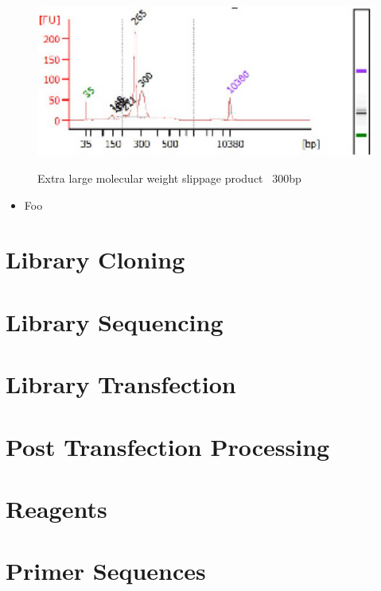 \documentclass[a4paper]{article}
\begin{document}
        	\begin{figure}[H]
				\centering
				\includegraphics[width=1.0\textwidth]{EmulsionPCRIssue.jpg}
				\label{fig:Bioanalyzer trace}
				\caption{Extra large molecular weight slippage product ~300bp}
        	\end{figure}
        \begin{itemize}
    	
        	\item Foo
        
        \end{itemize}
\section{Library Cloning}    
    
\section{Library Sequencing}    

\section{Library Transfection}    

\section{Post Transfection Processing}    


\section{Reagents}
    
\section{Primer Sequences}
\end{document}
